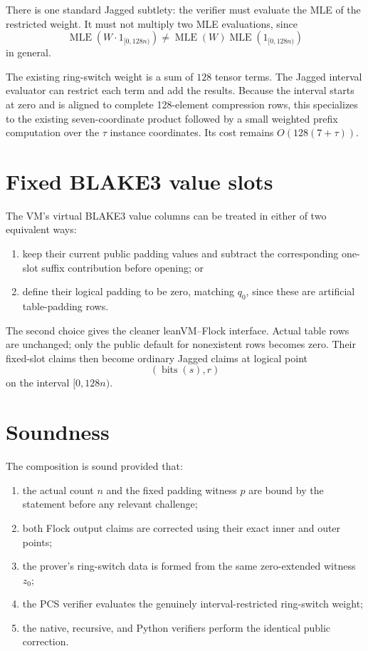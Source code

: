 \documentclass[11pt]{article}
\begin{document}
There is one standard Jagged subtlety: the verifier must evaluate the MLE of
the restricted weight.  It must not multiply two MLE evaluations, since
\[
 \operatorname{MLE}(W\cdot 1_{[0,128n)})
 \neq
 \operatorname{MLE}(W)\operatorname{MLE}(1_{[0,128n)})
\]
in general.

The existing ring-switch weight is a sum of \(128\) tensor terms.  The Jagged
interval evaluator can restrict each term and add the results.  Because the
interval starts at zero and is aligned to complete 128-element compression
rows, this specializes to the existing seven-coordinate product followed by a
small weighted prefix computation over the \(\tau\) instance coordinates.
Its cost remains \(O(128(7+\tau))\).

\section{Fixed BLAKE3 value slots}

The VM's virtual BLAKE3 value columns can be treated in either of two
equivalent ways:

\begin{enumerate}
  \item keep their current public padding values and subtract the corresponding
        one-slot suffix contribution before opening; or
  \item define their logical padding to be zero, matching \(q_0\), since these
        are artificial table-padding rows.
\end{enumerate}

The second choice gives the cleaner leanVM--Flock interface.  Actual table rows
are unchanged; only the public default for nonexistent rows becomes zero.
Their fixed-slot claims then become ordinary Jagged claims at logical point
\[
    (\operatorname{bits}(s),r)
\]
on the interval \([0,128n)\).

\section{Soundness}

The composition is sound provided that:

\begin{enumerate}
  \item the actual count \(n\) and the fixed padding witness \(p\) are bound by
        the statement before any relevant challenge;
  \item both Flock output claims are corrected using their exact inner and
        outer points;
  \item the prover's ring-switch data is formed from the same zero-extended
        witness \(z_0\);
  \item the PCS verifier evaluates the genuinely interval-restricted
        ring-switch weight;
  \item the native, recursive, and Python verifiers perform the identical
        public correction.
\end{enumerate}
\end{document}
